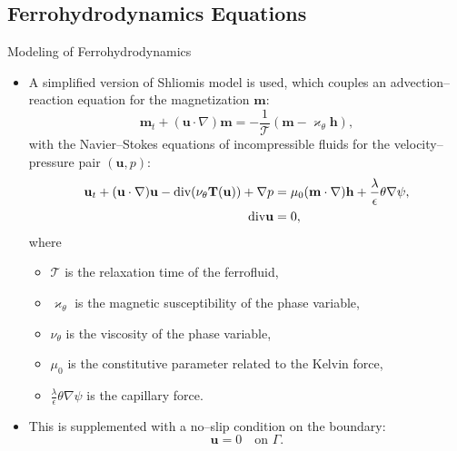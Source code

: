 \documentclass[9pt]{beamer}
\newcommand{\grad}{\nabla}
\newcommand{\diverg}{\textup{div} }
\newcommand{\eps}{\epsilon}
\begin{document}
\subsection{Ferrohydrodynamics Equations}
\begin{frame}{Modeling of Ferrohydrodynamics}
\begin{itemize}
	\item A simplified version of Shliomis model is used, which couples an advection--reaction equation for the magnetization $\mathbf{m}$:
	$$
		\mathbf{m}_t + (\mathbf{u}\cdot \grad)\mathbf{m}=-\frac{1}{\mathscr{T}}(\mathbf{m} - \varkappa_\theta\mathbf{h}),
	$$
	with the Navier--Stokes equations of incompressible fluids for the velocity--pressure pair $(\mathbf{u},p)$:
	\begin{align*}
		\mathbf{u}_t + (\mathbf{u}\cdot\grad)\mathbf{u} - \diverg (\nu_\theta \mathbf{T(u)}) + \grad p &= \mu_0(\mathbf{m}\cdot \grad)\mathbf{h} + \frac{\lambda}{\eps}\theta\grad \psi,\\
		\diverg \mathbf{u} &= 0,
	\end{align*}
	where
	\begin{itemize}
		\item $\mathscr{T}$ is the relaxation time of the ferrofluid,
		\item $\varkappa_\theta$ is the magnetic susceptibility of the phase variable,
		\item $\nu_\theta$ is the viscosity of the phase variable,
		\item $\mu_0$ is the constitutive parameter related to the Kelvin force,
		\item $\frac{\lambda}{\eps}\theta\grad \psi$ is the capillary force.
	\end{itemize}
	\item This is supplemented with a no--slip condition on the boundary:
	$$
		\mathbf{u} = 0 \quad \text{on }\Gamma. 
	$$
\end{itemize}
\end{frame}
\end{document}
